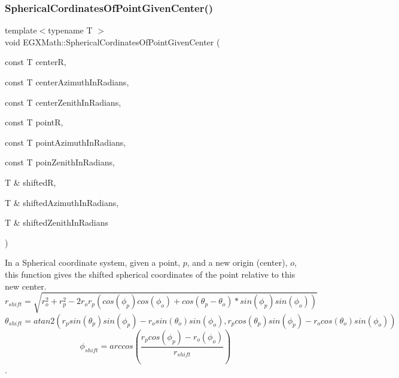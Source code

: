 \subsubsection{\texorpdfstring{Spherical\+Cordinates\+Of\+Point\+Given\+Center()}{SphericalCordinatesOfPointGivenCenter()}}
{\footnotesize\ttfamily template$<$typename T $>$ \\
void E\+G\+X\+Math\+::\+Spherical\+Cordinates\+Of\+Point\+Given\+Center (\begin{DoxyParamCaption}\item[{const T}]{centerR,  }\item[{const T}]{center\+Azimuth\+In\+Radians,  }\item[{const T}]{center\+Zenith\+In\+Radians,  }\item[{const T}]{pointR,  }\item[{const T}]{point\+Azimuth\+In\+Radians,  }\item[{const T}]{poin\+Zenith\+In\+Radians,  }\item[{T \&}]{shiftedR,  }\item[{T \&}]{shifted\+Azimuth\+In\+Radians,  }\item[{T \&}]{shifted\+Zenith\+In\+Radians }\end{DoxyParamCaption})}



In a Spherical coordinate system, given a point, $p$, and a new origin (center), $o$, this function gives the shifted spherical coordinates of the point relative to this new center. \[ r_{shift} = \sqrt{r_o^2+r_p^2 - 2 r_o r_p ( cos(\phi_p) cos(\phi_o) + cos(\theta_p-\theta_o) * sin(\phi_p) sin(\phi_o))}\] \[ \theta_{shift} = atan2( r_p sin(\theta_p) sin(\phi_p) - r_o sin(\theta_o) sin(\phi_o) , r_p cos(\theta_p) sin(\phi_p) - r_o cos(\theta_o) sin(\phi_o) )\] \[ \phi_{shift} = arccos(\frac{r_p cos(\phi_p) - r_o (\phi_o)}{r_{shift}}) \]. 

